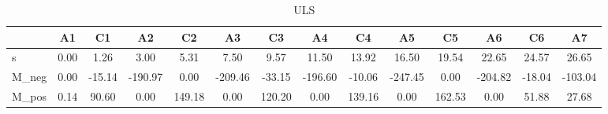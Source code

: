 \begin{table}[H]
\caption{ULS}
\begin{tabular}{lSSSSSSSSSSSSS}
\toprule
{} & {A1} & {C1} & {A2} & {C2} & {A3} & {C3} & {A4} & {C4} & {A5} & {C5} & {A6} & {C6} & {A7} \\
\midrule
s & 0.00 & 1.26 & 3.00 & 5.31 & 7.50 & 9.57 & 11.50 & 13.92 & 16.50 & 19.54 & 22.65 & 24.57 & 26.65 \\
M_neg & 0.00 & -15.14 & -190.97 & 0.00 & -209.46 & -33.15 & -196.60 & -10.06 & -247.45 & 0.00 & -204.82 & -18.04 & -103.04 \\
M_pos & 0.14 & 90.60 & 0.00 & 149.18 & 0.00 & 120.20 & 0.00 & 139.16 & 0.00 & 162.53 & 0.00 & 51.88 & 27.68 \\
\bottomrule
\end{tabular}
\end{table}
